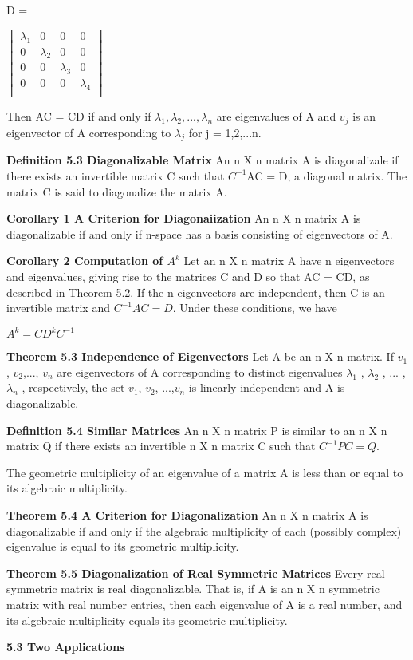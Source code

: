 \documentclass{article}
\begin{document}
D =


$
\begin{vmatrix}

\lambda_1 & 0 & 0 & 0 \\
0 & \lambda_2 & 0 & 0 \\
0 & 0 & \lambda_3 & 0 \\
0 & 0 & 0 & \lambda_4 \\  
\end{vmatrix}
$

Then AC = CD if and only if $\lambda_1, \lambda_2, ..., \lambda_n$ are eigenvalues of A and $v_j$ is an eigenvector of A corresponding to $\lambda_j$ for j = 1,2,...n.

\textbf {Definition 5.3 Diagonalizable Matrix} An n X n matrix A is diagonalizale if there exists an invertible matrix C such that $C^{-1}$AC = D, a diagonal matrix. The matrix C is said to diagonalize the matrix A.

\textbf {Corollary 1 A Criterion for Diagonaiization} An n X n matrix A is diagonalizable if and only if n-space has a basis consisting of eigenvectors of A.

\textbf {Corollary 2 Computation of $A^k$} Let an n X n matrix A have n eigenvectors and eigenvalues, giving rise to the matrices C and D so that AC = CD, as described in Theorem 5.2. If the n eigenvectors are independent, then C is an invertible matrix and $C^{-1}AC=D$. Under these conditions, we have

\begin{center}

$A^{k} = CD^{k}C^{-1}$
\end{center}

\textbf {Theorem 5.3 Independence of Eigenvectors}
Let A be an n X n matrix. If $v_1$, $v_2$,..., $v_n$ are eigenvectors of A corresponding to distinct eigenvalues $\lambda_1$ , $\lambda_2$ , ... , $\lambda_n$ , respectively, the set {$v_1$, $v_2$, ...,$v_n$} is linearly independent and A is diagonalizable.

\textbf {Definition 5.4 Similar Matrices}
An n X n matrix P is similar to an n X n matrix Q if there exists an invertible n X n matrix C such that $C^{-1}PC=Q$.

The geometric multiplicity of an eigenvalue of a matrix A is less than or equal to its algebraic multiplicity.

\textbf {Theorem 5.4 A Criterion for Diagonalization} An n X n matrix A is diagonalizable if and only if the algebraic multiplicity of each (possibly complex) eigenvalue is equal to its geometric multiplicity.

\textbf {Theorem 5.5 Diagonalization of Real Symmetric Matrices} Every real symmetric matrix is real diagonalizable. That is, if A is an n X n symmetric matrix with real number entries, then each eigenvalue of A is a real number, and its algebraic multiplicity equals its geometric multiplicity.

\textbf {5.3 Two Applications}
\end{document}

